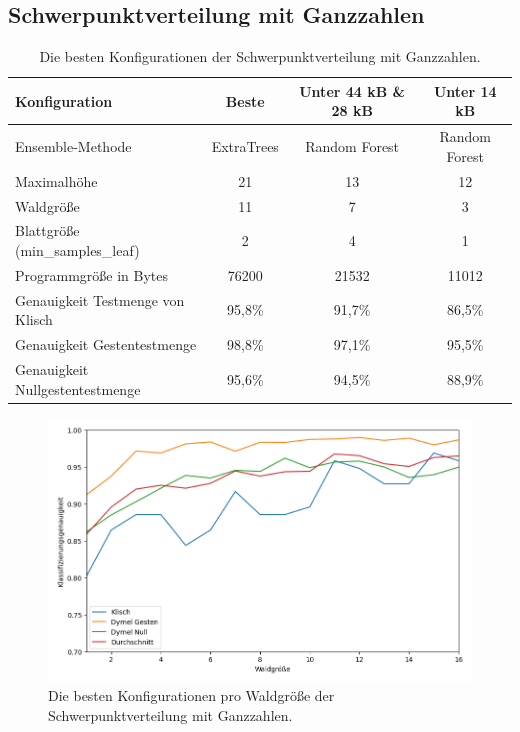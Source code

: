 \subsection{Schwerpunktverteilung mit Ganzzahlen}
\begin{table}[h!]
    \hspace{-0.5cm}
    \begin{tabular}{ | l | c | c | c |}
        \hline
        Konfiguration & Beste & Unter 44 kB \& 28 kB & Unter 14 kB \\\hline
        Ensemble-Methode & ExtraTrees & Random Forest & Random Forest \\\hline
        Maximalhöhe & 21 & 13 & 12 \\\hline
        Waldgröße & 11 & 7 & 3 \\\hline
        Blattgröße (min\_samples\_leaf) & 2 & 4 & 1 \\\hline
        Programmgröße in Bytes & 76200 & 21532 & 11012 \\\hline
        Genauigkeit Testmenge von Klisch & 95,8\% & 91,7\% & 86,5\% \\\hline
        Genauigkeit Gestentestmenge & 98,8\% & 97,1\% & 95,5\% \\\hline
        Genauigkeit Nullgestentestmenge & 95,6\% & 94,5\% & 88,9\% \\\hline
    \end{tabular}
    \caption{Die besten Konfigurationen der Schwerpunktverteilung mit Ganzzahlen.}
    \label{tab:schwerpunktverteilung_int}
\end{table}
\begin{figure}[h!]
    \centering
    \includegraphics[width=\linewidth]{images/cocd_int_acc_per_size.png}
    \caption{Die besten Konfigurationen pro Waldgröße der Schwerpunktverteilung mit Ganzzahlen.}
    \label{fig:cocd_int_per_forest_size}
\end{figure}
